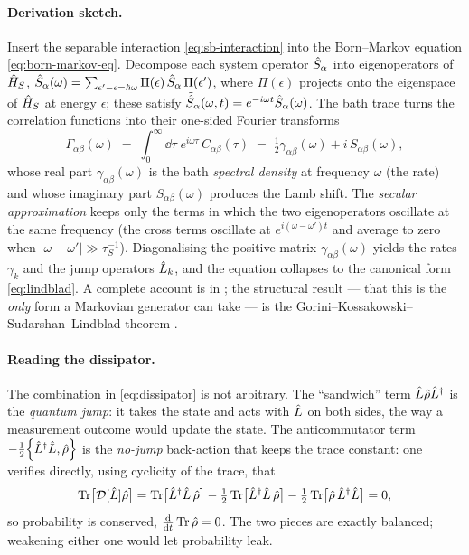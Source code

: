 \paragraph{Derivation sketch.}
Insert the separable interaction \cref{eq:sb-interaction} into the
Born--Markov equation \cref{eq:born-markov-eq}. Decompose each
system operator $\hat{S}_\alpha$ into eigenoperators of $\hat{H}_S$,
$\hat{S}_\alpha(\omega)=\sum_{\epsilon'-\epsilon=\hbar\omega}
\Pi(\epsilon)\,\hat{S}_\alpha\,\Pi(\epsilon')$, where $\Pi(\epsilon)$
projects onto the eigenspace of $\hat{H}_S$ at energy $\epsilon$;
these satisfy $\tilde{\hat{S}}_\alpha(\omega,t)=e^{-i\omega t}\hat{S}_\alpha(\omega)$.
The bath trace turns the correlation functions into their
one-sided Fourier transforms
\begin{equation}
\label{eq:gamma-transform}
\Gamma_{\alpha\beta}(\omega)
\;=\; \int_0^\infty\!\!\dd\tau\; e^{i\omega\tau}\,C_{\alpha\beta}(\tau)
\;=\; \tfrac12\gamma_{\alpha\beta}(\omega) + i\,S_{\alpha\beta}(\omega),
\end{equation}
whose real part $\gamma_{\alpha\beta}(\omega)$ is the bath
\emph{spectral density} at frequency $\omega$ (the rate) and whose
imaginary part $S_{\alpha\beta}(\omega)$ produces the Lamb shift.
The \emph{secular approximation} keeps only the terms in which the
two eigenoperators oscillate at the same frequency (the cross terms
oscillate at $e^{i(\omega-\omega')t}$ and average to zero when
$|\omega-\omega'|\gg \tau_S^{-1}$). Diagonalising the positive
matrix $\gamma_{\alpha\beta}(\omega)$ yields the rates $\gamma_k$
and the jump operators $\hat{L}_k$, and the equation collapses to the
canonical form \cref{eq:lindblad}. A complete account is in
\cite{breuer2002}; the structural result --- that this is the
\emph{only} form a Markovian generator can take --- is the
Gorini--Kossakowski--Sudarshan--Lindblad theorem
\cite{lindblad1976,gorini1976}.

\paragraph{Reading the dissipator.}
The combination in \cref{eq:dissipator} is not arbitrary. The
``sandwich'' term $\hat{L}\hat{\rho}\hat{L}^\dagger$ is the \emph{quantum
jump}: it takes the state and acts with $\hat{L}$ on both sides, the
way a measurement outcome would update the state. The
anticommutator term $-\tfrac12\acomm{\op L^\dagger\op L}{\op\rho}$
is the \emph{no-jump} back-action that keeps the trace constant:
one verifies directly, using cyclicity of the trace, that
\begin{equation}
\label{eq:trace-preserving}
\operatorname{Tr}\bigl[\mathcal D[\hat{L}]\hat{\rho}\bigr]
= \operatorname{Tr}\bigl[\hat{L}^\dagger\hat{L}\,\hat{\rho}\bigr]
- \tfrac12\operatorname{Tr}\bigl[\hat{L}^\dagger\hat{L}\,\hat{\rho}\bigr]
- \tfrac12\operatorname{Tr}\bigl[\hat{\rho}\,\hat{L}^\dagger\hat{L}\bigr]
= 0,
\end{equation}
so probability is conserved, $\tfrac{\dd}{\dd t}\operatorname{Tr}\hat{\rho}=0$. The
two pieces are exactly balanced; weakening either one would let
probability leak.

